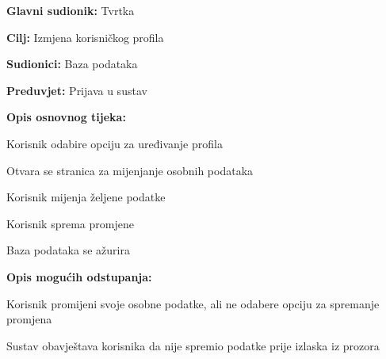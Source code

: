 				\noindent {}
				\begin{packed_item}
					
					\item \textbf{Glavni sudionik: } Tvrtka
						\item  \textbf{Cilj:} Izmjena korisničkog profila
					\item  \textbf{Sudionici:} Baza podataka
					\item  \textbf{Preduvjet:} Prijava u sustav
					\item  \textbf{Opis osnovnog tijeka:}
					
					\item[] \begin{packed_enum}
						
						\item Korisnik odabire opciju za uređivanje profila
						\item Otvara se stranica za mijenjanje osobnih podataka
						\item Korisnik mijenja željene podatke
						\item Korisnik sprema promjene
						\item Baza podataka se ažurira
					\end{packed_enum}
					
					\item  \textbf{Opis mogućih odstupanja:}
					
					\item[] \begin{packed_item}
						
						\item[3.a] Korisnik promijeni svoje osobne podatke, ali ne odabere opciju za spremanje promjena
						\item[] \begin{packed_enum}
							
							\item Sustav obavještava korisnika da nije spremio podatke prije izlaska iz prozora
							
						\end{packed_enum}
					\end{packed_item}
				\end{packed_item}
				
